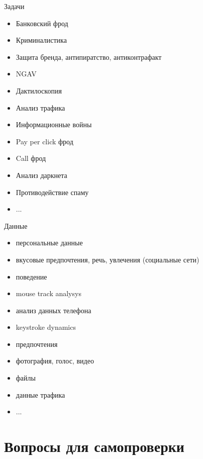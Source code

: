   \begin{frame}{Задачи}
  \begin{itemize}
  	\item Банковский фрод
  	\item Криминалистика
  	\item Защита бренда, антипиратство, антиконтрафакт
  	\item NGAV
  	\item Дактилоскопия
  	\item Анализ трафика
  	\item Информационные войны
  	\item Pay per click фрод
  	\item Call фрод
  	\item Анализ даркнета
  	\item Противодействие спаму
  	\item ...
  \end{itemize} 
  \end{frame}
 
  \begin{frame}{Данные}
  \begin{itemize}
     \item персональные данные
     \item вкусовые предпочтения, речь, увлечения (социальные сети)
     \item поведение
     \item mouse track analysys 
     \item анализ данных телефона
     \item keystroke dynamics
     \item предпочтения
     \item фотография, голос, видео
     \item файлы
     \item данные трафика
     \item ...
  \end{itemize}
  \end{frame}  


 \section{Вопросы для самопроверки}
  

